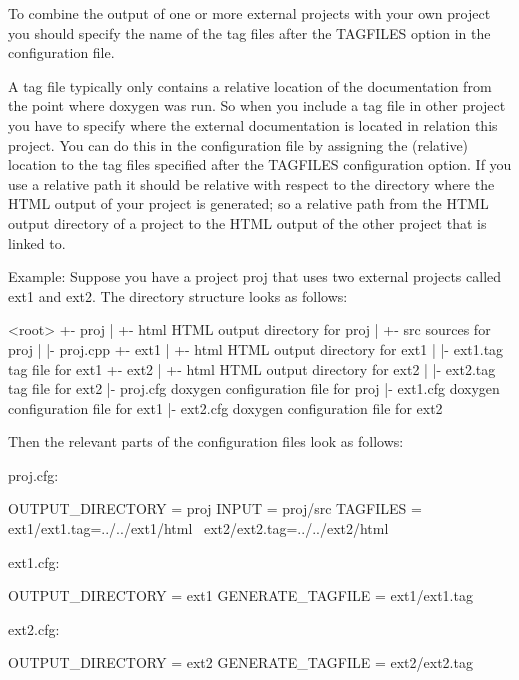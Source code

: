 To combine the output of one or more external projects with your own project you should specify the name of the tag files after the T\+A\+G\+F\+I\+L\+ES option in the configuration file.

A tag file typically only contains a relative location of the documentation from the point where doxygen was run. So when you include a tag file in other project you have to specify where the external documentation is located in relation this project. You can do this in the configuration file by assigning the (relative) location to the tag files specified after the T\+A\+G\+F\+I\+L\+ES configuration option. If you use a relative path it should be relative with respect to the directory where the H\+T\+ML output of your project is generated; so a relative path from the H\+T\+ML output directory of a project to the H\+T\+ML output of the other project that is linked to.

\begin{DoxyParagraph}{Example\+: }
Suppose you have a project {\ttfamily proj} that uses two external projects called {\ttfamily ext1} and {\ttfamily ext2}. The directory structure looks as follows\+:
\end{DoxyParagraph}
\begin{DoxyParagraph}{}
\begin{DoxyVerb}<root>
  +- proj
  |   +- html               HTML output directory for proj
  |   +- src                sources for proj
  |   |- proj.cpp
  +- ext1
  |   +- html               HTML output directory for ext1
  |   |- ext1.tag           tag file for ext1
  +- ext2
  |   +- html               HTML output directory for ext2
  |   |- ext2.tag           tag file for ext2
  |- proj.cfg               doxygen configuration file for proj
  |- ext1.cfg               doxygen configuration file for ext1
  |- ext2.cfg               doxygen configuration file for ext2
\end{DoxyVerb}

\end{DoxyParagraph}
\begin{DoxyParagraph}{}
Then the relevant parts of the configuration files look as follows\+: 
\end{DoxyParagraph}
\begin{DoxyParagraph}{}
proj.\+cfg\+: \begin{DoxyVerb}OUTPUT_DIRECTORY  = proj
INPUT             = proj/src
TAGFILES          = ext1/ext1.tag=../../ext1/html \
                    ext2/ext2.tag=../../ext2/html 
\end{DoxyVerb}
 ext1.\+cfg\+: \begin{DoxyVerb}OUTPUT_DIRECTORY  = ext1
GENERATE_TAGFILE  = ext1/ext1.tag 
\end{DoxyVerb}
 ext2.\+cfg\+: \begin{DoxyVerb}OUTPUT_DIRECTORY  = ext2
GENERATE_TAGFILE  = ext2/ext2.tag
\end{DoxyVerb}

\end{DoxyParagraph}
 
